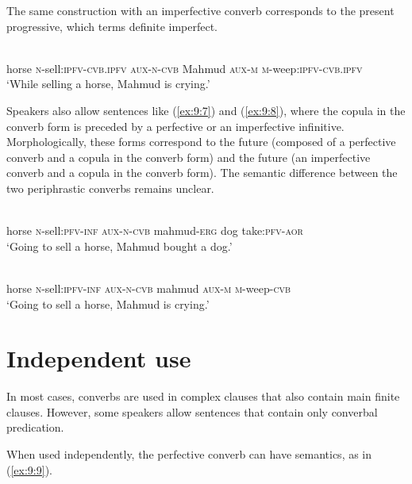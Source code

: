 ﻿\documentclass[output=paper]{langsci/langscibook}
\begin{document}
The same construction with an imperfective converb corresponds to the
present progressive, which \citet[87]{magometov1982} terms definite imperfect.

\ea \label{ex:9:6} %
\\
horse \textsc{n}-sell:\textsc{ipfv}-\textsc{cvb.ipfv} \textsc{aux}-\textsc{n}-\textsc{cvb} Mahmud \textsc{aux}-\textsc{m} \textsc{m}-weep:\textsc{ipfv}-\textsc{cvb.ipfv}\\
\glt `While selling a horse, Mahmud is crying.'
\z

Speakers also allow sentences like (\ref{ex:9:7}) and (\ref{ex:9:8}), where the copula in
the converb form is preceded by a perfective or an imperfective
infinitive. Morphologically, these forms correspond to the future
 (composed of a perfective converb and a copula in the
converb form) and the future  (an imperfective converb and a
copula in the converb form). The semantic difference between the two
periphrastic converbs remains unclear.

\ea \label{ex:9:7} %
\\
horse \textsc{n}-sell:\textsc{pfv}-\textsc{inf} \textsc{aux}-\textsc{n}-\textsc{cvb} mahmud-\textsc{erg} dog take:\textsc{pfv}-\textsc{aor}\\
\glt `Going to sell a horse, Mahmud bought a dog.'

\ex \label{ex:9:8} %
\\
horse \textsc{n}-sell:\textsc{ipfv}-\textsc{inf} \textsc{aux}-\textsc{n}-\textsc{cvb} mahmud \textsc{aux}-\textsc{m} \textsc{m}-weep-\textsc{cvb}\\
\glt `Going to sell a horse, Mahmud is crying.'
\z

\removelastskip
{}

\section{Independent use}\label{independent-use}

In most cases, converbs are used in complex clauses that also contain
main finite clauses. However, some speakers allow sentences that contain
only converbal predication.

When used independently, the perfective converb can have 
semantics, as in (\ref{ex:9:9}).
\end{document}
